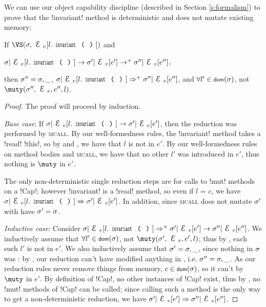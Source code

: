 We can use our object capability discipline (described in Section \ref{s:formalism}) to prove that the \Q!invariant! method is deterministic and does not mutate existing memory:%
\SS\begin{Lemma}[Determinism]\rm If $\VS(\s, \EV[l.\invariant])$ and
\begin{iitemize}
\item[] $\s|\EV[l.\invariant] \rightarrow \s'|\EV[e'] \rightarrow^{+} \s''|\EV[e'']$,
\end{iitemize}

\indent then $\sigma'' = \sigma,\_$, $\s|\EV[l.\invariant] \Rightarrow^+ \s''|\EV[e'']$, and $\forall l' \in \dom(\s)$, not $\muty(\s'', \EV, e'', l)$.
\end{Lemma}\SS
\begin{proof}
The proof will proceed by induction.

\emph{Base case}: If $\s|\EV[l.\invariant] \rightarrow \s'|\EV[e']$, then the reduction was performed by \textsc{mcall}.
By our well-formedness rules, the \Q!invariant! method takes a \Q!read! \Q!this!, so by  and , we have that $l$ is not \muty in $e'$. By our well-formedness rules on method bodies and \textsc{mcall}, we have that no other $l'$ was introduced in $e'$, thus nothing is $\muty$ in $e'$.

The only non-deterministic single reduction steps are for calls to \Q!mut! methods on a \Q!Cap!; however \Q!invariant! is a \Q!read! method, so even if $l$ = $c$, we have $\s|\EV[l.\invariant] \Rightarrow \s'|\EV[e']$. In addition, since \textsc{mcall} does not mutate $\sigma'$ with have $\sigma' = \sigma$.

\emph{Inductive case}: Consider $\s|\EV[l.\invariant] \Rightarrow^+ \s'|\EV[e'] \rightarrow \s''|\EV[e'']$. We inductively assume that $\forall l' \in \dom(\s)$, not $\muty(\s', \EV, e', l)$; thus by , each such $l'$ is not \muty in $e'$. We also inductively assume that $\sigma' = \sigma,\_$, since nothing in $\sigma$ was \muty: by , our reduction can't have modified anything in \s, i.e. $\sigma'' = \sigma,\_$. As our reduction rules never remove things from memory, $c \in \dom(\s)$, so it can't by $\muty$ in $e'$. By definition of \Q!Cap!, no other instances of \Q!Cap! exist, thus by , no \Q!mut! methods of \Q!Cap! can be called; since calling such a method is the only way to get a non-deterministic reduction, we have $\s'|\EV[e'] \Rightarrow \s''|\EV[e'']$.
\end{proof}

